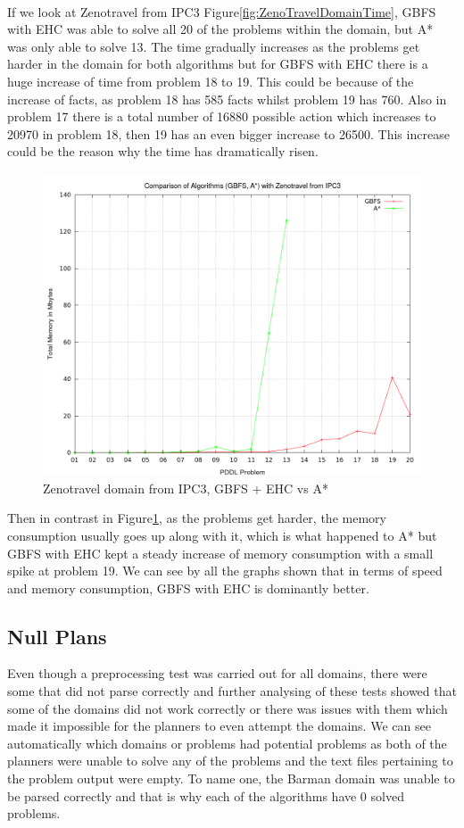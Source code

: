 \\
If we look at Zenotravel from IPC3 Figure\ref{fig:ZenoTravelDomainTime}, GBFS with EHC was able to solve all 20 of the problems within the domain, but A* was only able to solve 13. The time gradually increases as the problems get harder in the domain for both algorithms but for GBFS with EHC there is a huge increase of time from problem 18 to 19. This could be because of the increase of facts, as problem 18 has 585 facts whilst problem 19 has 760. Also in problem 17 there is a total number of 16880 possible action which increases to 20970 in problem 18, then 19 has an even bigger increase to 26500. This increase could be the reason why the time has dramatically risen. 
\begin{figure}[!htb]
    \centering
    \includegraphics[scale=0.35]{ZenoMemory.png}
    \caption{Zenotravel domain from IPC3, GBFS + EHC vs A* }
    \label{fig:ZenoTravelDomainMemory}
\end{figure}
Then in contrast in Figure\ref{fig:ZenoTravelDomainMemory}, as the problems get harder, the memory consumption usually goes up along with it, which is what happened to A* but GBFS with EHC kept a steady increase of memory consumption with a small spike at problem 19. We can see by all the graphs shown that in terms of speed and memory consumption, GBFS with EHC is dominantly better.
\subsection{Null Plans}
Even though a preprocessing test was carried out for all domains, there were some that did not parse correctly and further analysing of these tests showed that some of the domains did not work correctly or there was issues with them which made it impossible for the planners to even attempt the domains. We can see automatically which domains or problems had potential problems as both of the planners were unable to solve any of the problems and the text files pertaining to the problem output were empty. To name one, the Barman domain was unable to be parsed correctly and that is why each of the algorithms have 0 solved problems.
